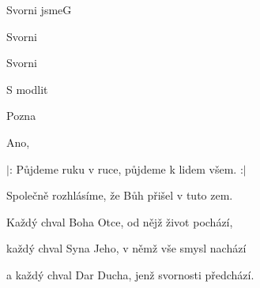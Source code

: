 \begin{song}{Svorni jsme}{G}{}

\begin{SBVerse}

Svorni 

Svorni 

S modlit

\end{SBVerse}

\begin{SBChorus}

Pozna

Ano, 

\end{SBChorus}

\begin{SBVerse}

$|$: Půjdeme ruku v ruce, půjdeme k lidem všem. :$|$

Společně rozhlásíme, že Bůh přišel v tuto zem.

\end{SBVerse}

\begin{SBVerse}

Každý chval Boha Otce, od nějž život pochází,

každý chval Syna Jeho, v němž vše smysl nachází

a každý chval Dar Ducha, jenž svornosti předchází.

\end{SBVerse}

\end{song}
